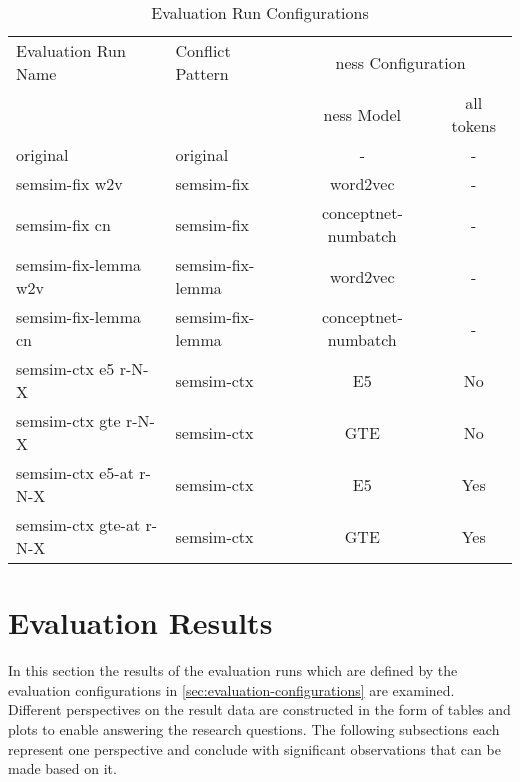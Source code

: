\documentclass[11pt, numbers=noenddot]{scrreprt}
\begin{document}
\begin{table}
\centering
\begin{tabular}{llcc}
\toprule
\multicolumn{1}{l}{Evaluation Run Name} & \multicolumn{1}{l}{Conflict Pattern} & \multicolumn{2}{c}{\gls{ness} Configuration} \\
\cmidrule{3-4}
\multicolumn{1}{l}{}   & \multicolumn{1}{l}{}  & \multicolumn{1}{c}{\gls{ness} Model}	& \multicolumn{1}{c}{all tokens} \\
\midrule
original                       & original                     & -                          & -                \\
semsim-fix w2v                 & semsim-fix                   & word2vec                   & -                \\
semsim-fix cn                 & semsim-fix                   & conceptnet-numbatch                      & -      \\
semsim-fix-lemma w2v           & semsim-fix-lemma             & word2vec                   & -                \\
semsim-fix-lemma cn           & semsim-fix-lemma             & conceptnet-numbatch                      & -      \\
semsim-ctx e5 r-N-X                & semsim-ctx                   & E5                         & No           \\
semsim-ctx gte r-N-X              & semsim-ctx                   & GTE                        & No            \\
semsim-ctx e5-at r-N-X             & semsim-ctx                   & E5                         & Yes          \\
semsim-ctx gte-at r-N-X           & semsim-ctx                   & GTE                        & Yes           \\
\end{tabular}
\caption{Evaluation Run Configurations}
\label{tab:evaluation-run-configs}
\end{table}


\section{Evaluation Results}
\label{sec:evaluation-results}
In this section the results of the evaluation runs which are defined by the evaluation configurations in \cref{sec:evaluation-configurations} are examined. Different perspectives on the result data are constructed in the form of tables and plots to enable answering the research questions. The following subsections each represent one perspective and conclude with significant observations that can be made based on it.
\end{document}
